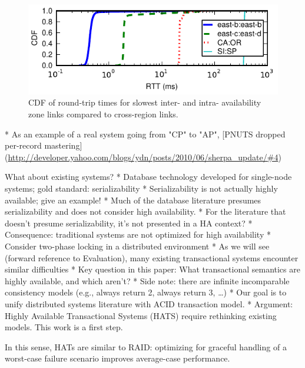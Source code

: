 \begin{figure}
\includegraphics[width=\columnwidth]{graphs/ping-plot.pdf}
\caption{CDF of round-trip times for slowest inter- and intra-
  availability zone links compared to cross-region links.}
\label{fig:rtt}
\end{figure}



* As an example of a real system going from "CP" to "AP", [PNUTS dropped per-record mastering](\url{http://developer.yahoo.com/blogs/ydn/posts/2010/06/sherpa_update/#4})

What about existing systems?
* Database technology developed for single-node systems; gold standard: serializability
	* Serializability is not actually highly available; give an example!
	* Much of the database literature presumes serializability and does not consider high availability.
	* For the literature that doesn't presume serializability, it's not presented in a HA context?
* Consequence: traditional systems are not optimized for high availability
	* Consider two-phase locking in a distributed environment
	* As we will see (forward reference to Evaluation), many existing transactional systems encounter similar difficulties
* Key question in this paper: What transactional semantics are highly available, and which aren't?
	* Side note: there are infinite incomparable consistency models (e.g., always return 2, always return 3, …)
	* Our goal is to unify distributed systems literature with ACID transaction model.
* Argument: Highly Available Transactional Systems (HATS) require rethinking existing models. This work is a first step.

In this sense, HATs are similar to RAID: optimizing for graceful
handling of a worst-case failure scenario improves average-case
performance.
